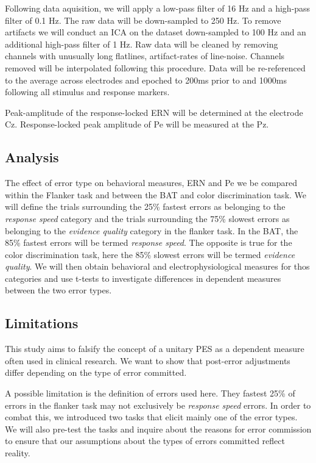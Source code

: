 \documentclass[
  man,floatsintext]{apa7}
\begin{document}
Following data aquisition, we will apply a low-pass filter of 16 Hz and a high-pass filter of 0.1 Hz. The raw data will be down-sampled to 250 Hz. To remove artifacts we will conduct an ICA on the dataset down-sampled to 100 Hz and an additional high-pass filter of 1 Hz. Raw data will be cleaned by removing channels with unusually long flatlines, artifact-rates of line-noise. Channels removed will be interpolated following this procedure. Data will be re-referenced to the average across electrodes and epoched to 200ms prior to and 1000ms following all stimulus and response markers.

Peak-amplitude of the response-locked ERN will be determined at the electrode Cz. Response-locked peak amplitude of Pe will be measured at the Pz.

\hypertarget{analysis}{%
\subsection{Analysis}\label{analysis}}

The effect of error type on behavioral measures, ERN and Pe we be compared within the Flanker task and between the BAT and color discrimination task. We will define the trials surrounding the 25\% fastest errors as belonging to the \emph{response speed} category and the trials surrounding the 75\% slowest errors as belonging to the \emph{evidence quality} category in the flanker task. In the BAT, the 85\% fastest errors will be termed \emph{response speed}. The opposite is true for the color discrimination task, here the 85\% slowest errors will be termed \emph{evidence quality}. We will then obtain behavioral and electrophysiological measures for thos categories and use t-tests to investigate differences in dependent measures between the two error types.

\hypertarget{limitations}{%
\subsection{Limitations}\label{limitations}}

This study aims to falsify the concept of a unitary PES as a dependent measure often used in clinical research. We want to show that post-error adjustments differ depending on the type of error committed.

A possible limitation is the definition of errors used here. They fastest 25\% of errors in the flanker task may not exclusively be \emph{response speed} errors. In order to combat this, we introduced two tasks that elicit mainly one of the error types. We will also pre-test the tasks and inquire about the reasons for error commission to ensure that our assumptions about the types of errors committed reflect reality.
\end{document}
